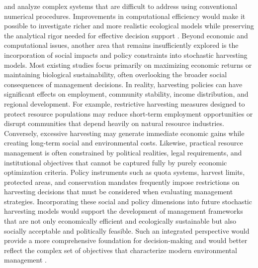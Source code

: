 \documentclass[11pt]{article}
\begin{document}
and analyze complex systems that are difficult to address using conventional numerical procedures. Improvements in computational efficiency would make it possible to investigate richer and more realistic ecological models while preserving the analytical rigor needed for effective decision support \citep{pramanik2024measuring,pramanik2024dependence}. Beyond economic and computational issues, another area that remains insufficiently explored is the incorporation of social impacts and policy constraints into stochastic harvesting models. Most existing studies focus primarily on maximizing economic returns or maintaining biological sustainability, often overlooking the broader social consequences of management decisions. In reality, harvesting policies can have significant effects on employment, community stability, income distribution, and regional development. For example, restrictive harvesting measures designed to protect resource populations may reduce short-term employment opportunities or disrupt communities that depend heavily on natural resource industries. Conversely, excessive harvesting may generate immediate economic gains while creating long-term social and environmental costs. Likewise, practical resource management is often constrained by political realities, legal requirements, and institutional objectives that cannot be captured fully by purely economic optimization criteria. Policy instruments such as quota systems, harvest limits, protected areas, and conservation mandates frequently impose restrictions on harvesting decisions that must be considered when evaluating management strategies. Incorporating these social and policy dimensions into future stochastic harvesting models would support the development of management frameworks that are not only economically efficient and ecologically sustainable but also socially acceptable and politically feasible. Such an integrated perspective would provide a more comprehensive foundation for decision-making and would better reflect the complex set of objectives that characterize modern environmental management \citep{pramanik2024parametric,pramanik2025dissecting}.
	
	
\end{document}
